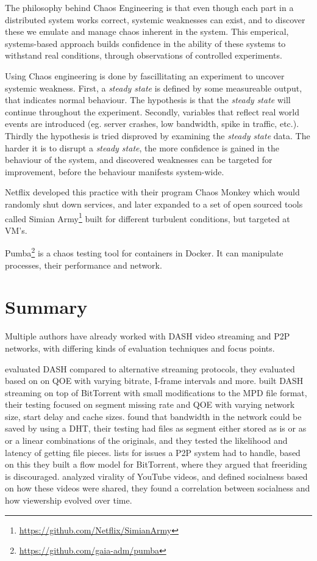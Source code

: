 The philosophy behind Chaos Engineering is that even though each part in a distributed system works correct, systemic weaknesses can exist, and to discover these we emulate and manage chaos inherent in the system. This emperical, systems-based approach builds confidence in the ability of these systems to withstand real conditions, through observations of controlled experiments.

Using Chaos engineering is done by fascillitating an experiment to uncover systemic weakness.
First, a \emph{steady state} is defined by some measureable output, that indicates normal behaviour. The hypothesis is that the \emph{steady state} will continue throughout the experiment.
Secondly, variables that reflect real world events are introduced (eg. server crashes, low bandwidth, spike in traffic, etc.).
Thirdly the hypothesis is tried disproved by examining the \emph{steady state} data.
The harder it is to disrupt a \emph{steady state}, the more confidence is gained in the behaviour of the system, and discovered weaknesses can be targeted for improvement, before the behaviour manifests system-wide.

Netflix developed this practice with their program Chaos Monkey which would randomly shut down services, and later expanded to a set of open sourced tools called Simian Army\footnote{\url{https://github.com/Netflix/SimianArmy}} built for different turbulent conditions, but targeted at \ac{VM}'s.

Pumba\footnote{\url{https://github.com/gaia-adm/pumba}} is a chaos testing tool for containers in Docker. It can manipulate processes, their performance and network.

\section{Summary}
Multiple authors have already worked with \ac{DASH} video streaming and \ac{P2P} networks, with differing kinds of evaluation techniques and focus points.

\citet{aloman2015performance} evaluated \ac{DASH} compared to alternative streaming protocols, they evaluated based on on \ac{QOE} with varying bitrate, I-frame intervals and more. \citet{gazdar2017toward} built \ac{DASH} streaming on top of BitTorrent with small modifications to the \ac{MPD} file format, their testing focused on segment missing rate and \ac{QOE} with varying network size, start delay and cache sizes. \citet{nguyen2009p2p} found that bandwidth in the network could be saved by using a \ac{DHT}, their testing had files as segment either stored as is or as or a linear combinations of the originals, and they tested the likelihood and latency of getting file pieces. \citet{qiu2004modeling} lists for issues a \ac{P2P} system had to handle, based on this they built a flow model for BitTorrent, where they argued that freeriding is discouraged. \citet{broxton2013catching} analyzed virality of YouTube videos, and defined socialness based on how these videos were shared, they found a correlation between socialness and how viewership evolved over time.

